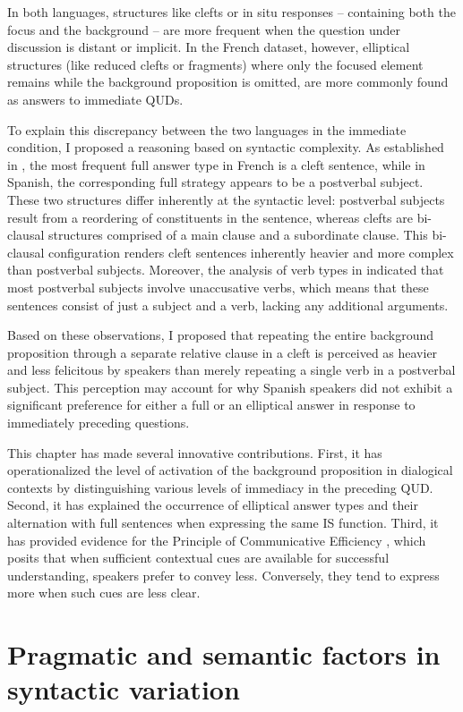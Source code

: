 In both languages, structures like clefts or in situ responses -- containing both the focus and the background -- are more frequent when the question under discussion is distant or implicit. In the French dataset, however, elliptical structures (like reduced clefts or fragments) where only the focused element remains while the background proposition is omitted, are more commonly found as answers to immediate QUDs.

To explain this discrepancy between the two languages in the immediate condition, I proposed a reasoning based on syntactic complexity. As established in , the most frequent full answer type in French is a cleft sentence, while in Spanish, the corresponding full strategy appears to be a postverbal subject. These two structures differ inherently at the syntactic level: postverbal subjects result from a reordering of constituents in the sentence, whereas clefts are bi-clausal structures comprised of a main clause and a subordinate clause. This bi-clausal configuration renders cleft sentences inherently heavier and more complex than postverbal subjects.
Moreover, the analysis of verb types in  indicated that most postverbal subjects involve unaccusative verbs, which means that these sentences consist of just a subject and a verb, lacking any additional arguments.

Based on these observations, I proposed that repeating the entire background proposition through a separate relative clause in a cleft is perceived as heavier and less felicitous by speakers than merely repeating a single verb in a postverbal subject. This perception may account for why Spanish speakers did not exhibit a significant preference for either a full or an elliptical answer in response to immediately preceding questions.

This chapter has made several innovative contributions. First, it has operationalized the level of activation of the background proposition in dialogical contexts by distinguishing various levels of immediacy in the preceding QUD. Second, it has explained the occurrence of elliptical answer types and their alternation with full sentences when expressing the same IS function. Third, it has provided evidence for the Principle of Communicative Efficiency \parencite{Levshina_2022}, which posits that when sufficient contextual cues are available for successful understanding, speakers prefer to convey less. Conversely, they tend to express more when such cues are less clear.

\section{Pragmatic and semantic factors in syntactic variation} \label{sub:8.3} %


